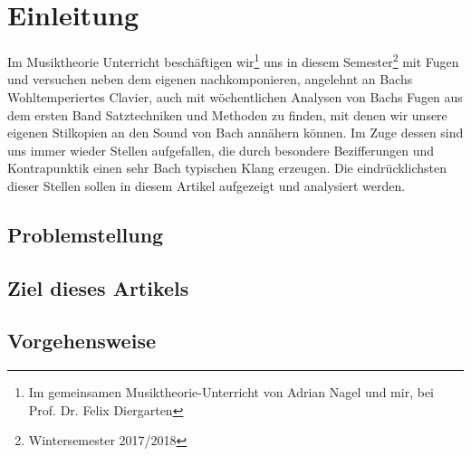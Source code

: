 \section{Einleitung}

Im Musiktheorie Unterricht beschäftigen wir\footnote{Im gemeinsamen Musiktheorie-Unterricht von Adrian Nagel und mir, bei Prof. Dr. Felix Diergarten} uns in diesem Semester\footnote{Wintersemester 2017/2018} mit Fugen und versuchen neben dem eigenen nachkomponieren, angelehnt an Bachs Wohltemperiertes Clavier, auch mit wöchentlichen Analysen von Bachs Fugen aus dem ersten Band Satztechniken und Methoden zu finden, mit denen wir unsere eigenen Stilkopien an den Sound von Bach annähern können.
Im Zuge dessen sind uns immer wieder Stellen aufgefallen, die durch besondere Bezifferungen und Kontrapunktik einen sehr Bach typischen Klang erzeugen. Die eindrücklichsten dieser Stellen sollen in diesem Artikel aufgezeigt und analysiert werden.

\subsection{Problemstellung}

\subsection{Ziel dieses Artikels}

\subsection{Vorgehensweise}
